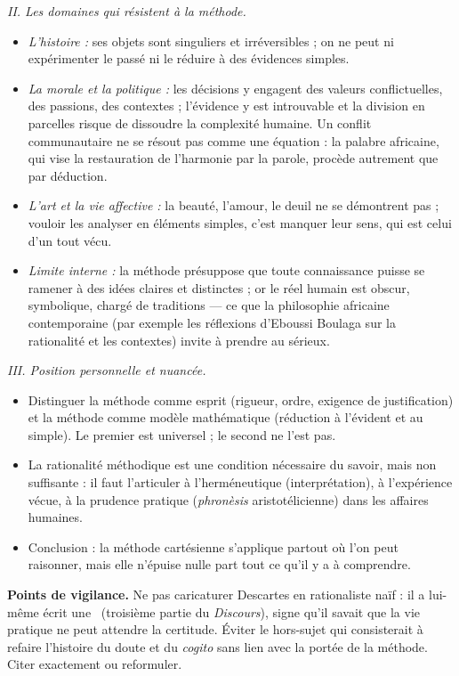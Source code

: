 \documentclass[11pt]{article}
\newcommand{\cle}[1]{{\popxbold\color{popdark}#1}}
\begin{document}
\begin{corrige}
\emph{II. Les domaines qui \cle{résistent} à la méthode.}
\begin{itemize}
\item \emph{L'histoire :} ses objets sont \cle{singuliers} et \cle{irréversibles} ; on ne peut ni expérimenter le passé ni le réduire à des évidences simples.
\item \emph{La morale et la politique :} les décisions y engagent des \cle{valeurs conflictuelles}, des passions, des contextes ; l'évidence y est introuvable et la division en parcelles risque de \cle{dissoudre la complexité humaine}. Un conflit communautaire ne se résout pas comme une équation : la \cle{palabre africaine}, qui vise la restauration de l'harmonie par la parole, procède autrement que par déduction.
\item \emph{L'art et la vie affective :} la beauté, l'amour, le deuil ne se démontrent pas ; vouloir les analyser en éléments simples, c'est \cle{manquer leur sens}, qui est celui d'un \cle{tout vécu}.
\item \emph{Limite interne :} la méthode présuppose que toute connaissance puisse se ramener à des \cle{idées claires et distinctes} ; or le réel humain est \cle{obscur}, \cle{symbolique}, chargé de traditions — ce que la philosophie africaine contemporaine (par exemple les réflexions d'\cle{Eboussi Boulaga} sur la rationalité et les contextes) invite à prendre au sérieux.
\end{itemize}

\emph{III. Position personnelle et \cle{nuancée}.}
\begin{itemize}
\item Distinguer la méthode comme \cle{esprit} (rigueur, ordre, exigence de justification) et la méthode comme \cle{modèle mathématique} (réduction à l'évident et au simple). Le premier est universel ; le second ne l'est pas.
\item La \cle{rationalité méthodique} est une condition \cle{nécessaire} du savoir, mais non \cle{suffisante} : il faut l'articuler à l'\cle{herméneutique} (interprétation), à l'expérience vécue, à la \cle{prudence pratique} (\emph{phronèsis} aristotélicienne) dans les affaires humaines.
\item Conclusion : la méthode cartésienne s'applique partout où l'on peut \cle{raisonner}, mais elle n'\cle{épuise} nulle part tout ce qu'il y a à comprendre.
\end{itemize}

\textbf{Points de vigilance.} Ne pas \cle{caricaturer} Descartes en rationaliste naïf : il a lui-même écrit une \guillemotleft \cle{morale provisoire} \guillemotright\ (troisième partie du \emph{Discours}), signe qu'il savait que la vie pratique ne peut attendre la certitude. Éviter le hors-sujet qui consisterait à refaire l'histoire du doute et du \emph{cogito} sans lien avec la portée de la méthode. Citer exactement ou reformuler.
\end{corrige}
\end{document}
